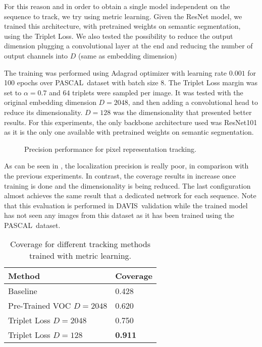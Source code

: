 For this reason and in order to obtain a single model independent on the sequence to track, we try using metric learning.
Given the ResNet model, we trained this architecture, with pretrained weights on semantic segmentation, using the Triplet Loss.
We also tested the possibility to reduce the output dimension plugging a convolutional layer at the end and reducing the number of output channels into $D$ (same as embedding dimension)

The training was performed using Adagrad optimizer with learning rate $0.001$ for 100 epochs over PASCAL~\pascal dataset with batch size $8$.
The Triplet Loss margin was set to $\alpha = 0.7$ and $64$ triplets were sampled per image.
It was tested with the original embedding dimension $D=2048$, and then adding a convolutional head to reduce its dimensionality.
$D=128$ was the dimensionality that presented better results.
For this experiments, the only backbone architecture used was ResNet101 as it is the only one available with pretrained weights on semantic segmentation.


\begin{figure}[h]
  \centering
  
  \caption{Precision performance for pixel representation tracking.}
  \label{fig:tracking_metric_learning}
\end{figure}

As can be seen in , the localization precision is really poor, in comparison with the previous experiments.
In contrast, the coverage results in  increase once training is done and the dimensionality is being reduced. The last configuration almost achieves the same result that a dedicated network for each sequence.
Note that this evaluation is performed in DAVIS~\davislast validation while the trained model has not seen any images from this dataset as it has been trained using the PASCAL~\pascal dataset.


\begin{table}[h]
  \centering
  \begin{tabular}{l|l}
    \toprule
    Method                   & Coverage       \\
    \midrule
    Baseline                 & 0.428          \\
    Pre-Trained VOC $D=2048$ & 0.620          \\
    Triplet Loss $D=2048$    & 0.750          \\
    Triplet Loss $D=128$     & \textbf{0.911} \\
    \bottomrule
  \end{tabular}
  \caption{Coverage for different tracking methods trained with metric learning. }
  \label{tab:coverage_tracking_metric_learning}
\end{table}

